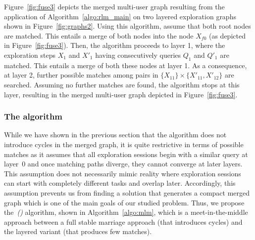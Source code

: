  Figure~\ref{fig:fuse3} depicts the merged multi-user graph resulting from the application of Algorithm~\ref{algo:rlm_main} on two layered exploration graphs shown in Figure~\ref{fig:graphs2}.
Using this algorithm, assume that both root nodes are matched. This entails a merge of both nodes into the node $X_{f0}$ (as depicted in Figure~\ref{fig:fuse3}). Then, the algorithm proceeds to layer 1, where the exploration steps $X_1$ and $X'_1$ having consecutively queries $Q_1$ and $Q'_{1}$ are matched. This entails a merge of both these nodes at layer 1. As a consequence, at layer 2, further possible matches among pairs in $\{X_{11}\} \times \{X'_{11}, X'_{12}\} $ are searched. Assuming no further matches are found, the algorithm stops at this layer, resulting in the merged multi-user graph depicted in Figure~\ref{fig:fuse3}.   



     

\subsubsection{The \mlmLong{} algorithm}
While we have shown in the previous section that the \rlm{} algorithm does not introduce cycles in the merged graph, it is quite restrictive in terms of possible matches as it assumes that all exploration sessions begin with a similar query at layer~0 and once matching paths diverge, they cannot converge at later layers. This assumption does not necessarily mimic reality where exploration sessions can start with completely different tasks and overlap later. 
Accordingly, this assumption prevents us from finding a solution that generates a compact merged graph which is one of the main goals of our studied problem. %
Thus, we propose the~\emph{\mlmLong (\mlm)} algorithm, shown in Algorithm~\ref{algo:mlm}, which is a meet-in-the-middle approach between a full stable marriage approach (that introduces cycles) and the layered variant (that produces few matches).


